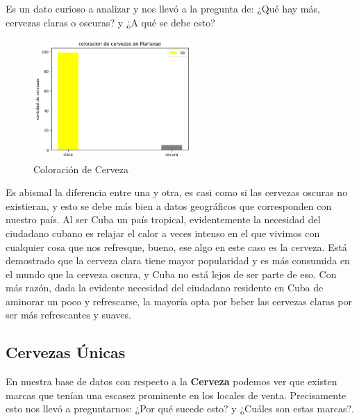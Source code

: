 \documentclass[a4paper,12pt]{article}
\begin{document}
Es un dato curioso a analizar y nos llevó a la pregunta de: ¿Qué hay más, cervezas claras o oscuras? y ¿A qué se debe esto?

\begin{figure}[h]
    \center
    \includegraphics[width=6cm]{c y o.png}
    \caption{Coloración de Cerveza}
    \label{fig:logo}
\end{figure}
Es abismal la diferencia entre una y otra, es casi como si las cervezas oscuras no existieran, y esto se debe más bien a datos geográficos que corresponden con nuestro país. 
Al ser Cuba un país tropical, evidentemente la necesidad del ciudadano cubano es relajar el calor a veces intenso en el que vivimos con cualquier cosa que nos refresque, bueno, ese algo en este caso es la cerveza. 
Está demostrado que la cerveza clara tiene mayor popularidad y es más consumida en el mundo que la cerveza oscura, y Cuba no está lejos de ser parte de eso. 
Con más razón, dada la evidente necesidad del ciudadano residente en Cuba de aminorar un poco y refrescarse, la mayoría opta por beber las cervezas claras por ser más refrescantes y suaves.

\subsection{Cervezas Únicas}
En nuestra base de datos con respecto a la \textbf{Cerveza} podemos ver que existen marcas que tenían una escasez prominente en los locales de venta. 
Precisamente esto nos llevó a preguntarnos: ¿Por qué sucede esto? y ¿Cuáles son estas marcas?.
\end{document}

